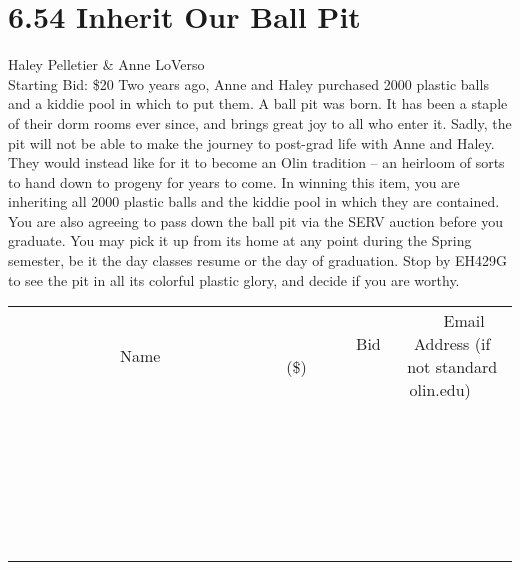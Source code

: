 \documentclass[11pt]{article}
\begin{document}
\section*{6.54 Inherit Our Ball Pit}
Haley Pelletier \& Anne LoVerso
\\
Starting Bid: \$20
\newline
Two years ago, Anne and Haley purchased 2000 plastic balls and a kiddie pool in which to put them. A ball pit was born. It has been a staple of their dorm rooms ever since, and brings great joy to all who enter it. Sadly, the pit will not be able to make the journey to post-grad life with Anne and Haley. They would instead like for it to become an Olin tradition -- an heirloom of sorts to hand down to progeny for years to come. In winning this item, you are inheriting all 2000 plastic balls and the kiddie pool in which they are contained. You are also agreeing to pass down the ball pit via the SERV auction before you graduate. You may pick it up from its home at any point during the Spring semester, be it the day classes resume or the day of graduation. Stop by EH429G to see the pit in all its colorful plastic glory, and decide if you are worthy.
\\[6ex]
\begin{tabular}{c c c}
~~~~~~~~~~~~~Name~~~~~~~~~~~~~ & ~~~~~~~~~Bid (\$)~~~~~~~~~  & ~~~Email Address (if not standard olin.edu)~~~\\
 & & \\
\hline
 & & \\
\hline
 & & \\
\hline
 & & \\
\hline
 & & \\
\hline
 & & \\
\hline
 & & \\
\hline
 & & \\
\hline
 & & \\
\hline
 & & \\
\hline
 & & \\
\hline
 & & \\
\hline
 & & \\
\hline
 & & \\
\hline
 & & \\
\hline
 & & \\
\hline
 & & \\
\hline
 & & \\
\hline
 & & \\
\hline
 & & \\
\hline
 & & \\
\hline
 & & \\
\hline
 & & \\
\hline
 & & \\
\hline
 & & \\
\hline
 & & \\
\hline
\end{tabular}
\newpage
\end{document}

